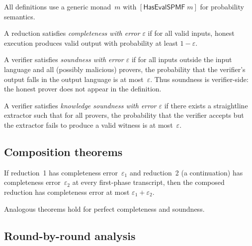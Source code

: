 All definitions use a generic monad~$m$ with $[\mathsf{HasEvalSPMF}\;m]$ for
probability semantics.

\begin{definition}[Completeness]
  \label{int:completeness}
  A reduction satisfies \emph{completeness with error $\varepsilon$} if for all
  valid inputs, honest execution produces valid output with probability at
  least $1 - \varepsilon$.
\end{definition}

\begin{definition}[Soundness]
  \label{int:soundness}
  A verifier satisfies \emph{soundness with error $\varepsilon$} if for all
  inputs outside the input language and all (possibly malicious) provers, the
  probability that the verifier's output falls in the output language is at
  most~$\varepsilon$.  Thus soundness is verifier-side: the honest prover does
  not appear in the definition.
\end{definition}

\begin{definition}
  \label{int:knowledge-soundness}
  A verifier satisfies \emph{knowledge soundness with error $\varepsilon$} if
  there exists a straightline extractor such that for all provers, the
  probability that the verifier accepts but the extractor fails to produce a
  valid witness is at most~$\varepsilon$.
\end{definition}

\subsection{Composition theorems}

\begin{theorem}
  \label{thm:completeness-comp}
  If reduction~1 has completeness error~$\varepsilon_1$ and reduction~2
  (a continuation) has completeness error~$\varepsilon_2$ at every first-phase
  transcript, then the composed reduction has completeness error at most
  $\varepsilon_1 + \varepsilon_2$.
\end{theorem}

Analogous theorems hold for perfect completeness and soundness.

\subsection{Round-by-round analysis}


